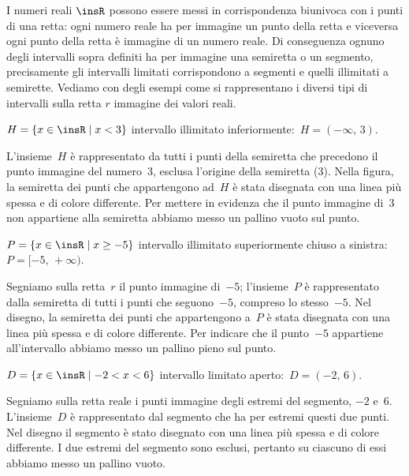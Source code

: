 I numeri reali $\insR$ possono essere messi in corrispondenza biunivoca con i
punti di una retta: ogni numero reale ha per immagine un punto della
retta e viceversa ogni punto della retta è immagine di un numero
reale. Di conseguenza ognuno degli intervalli sopra definiti ha per
immagine una semiretta o un segmento, precisamente gli intervalli
limitati corrispondono a segmenti e quelli illimitati a semirette.
Vediamo con degli esempi come si rappresentano i diversi tipi di
intervalli sulla retta $r$ immagine dei valori reali.

\begin{exrig}
 \begin{esempio}
 $H=\{x\in \insR\mid x<3\}$ intervallo illimitato inferiormente:~$H=(-\infty\text{,~}3)$.
 \end{esempio}

 L'insieme~$H$ è rappresentato da tutti i punti della
semiretta che precedono il punto immagine del numero~3, esclusa
l'origine della semiretta (3). Nella figura, la semiretta
dei punti che appartengono ad~$H$ è stata disegnata con una linea più
spessa e di colore differente. Per mettere in evidenza che il punto immagine di~3 non
appartiene alla semiretta abbiamo messo un pallino vuoto sul punto.
\begin{center}
 
\end{center}

 \begin{esempio}
 $P=\{x\in \insR\mid x\ge -5\}$ intervallo
illimitato superiormente chiuso a sinistra: $P=[-5\text{,~}+\infty)$.
 \end{esempio}

Segniamo sulla retta~$r$ il punto immagine di~$-5$;
l'insieme~$P$ è rappresentato dalla semiretta di tutti
i punti che seguono~$-5$, compreso lo stesso~$-5$. Nel disegno, la
semiretta dei punti che appartengono a~$P$ è stata disegnata con una
linea più spessa e di colore differente. Per indicare che il punto~$-5$ appartiene
all'intervallo abbiamo messo un pallino pieno sul punto.
\begin{center}
 
\end{center}

 \begin{esempio}
 $D=\{x\in \insR\mid -2<x<6\}$ intervallo limitato aperto:~$D=(-2\text{,~}6)$.
 \end{esempio}

Segniamo sulla retta reale i punti immagine degli estremi del segmento,
$-2$ e~$6$. L'insieme~$D$ è rappresentato dal segmento che
ha per estremi questi due punti. Nel disegno il segmento è stato
disegnato con una linea più spessa e di colore differente. I due estremi del segmento sono
esclusi, pertanto su ciascuno di essi abbiamo messo un pallino vuoto.
\begin{center}
 
\end{center}


\end{exrig}

